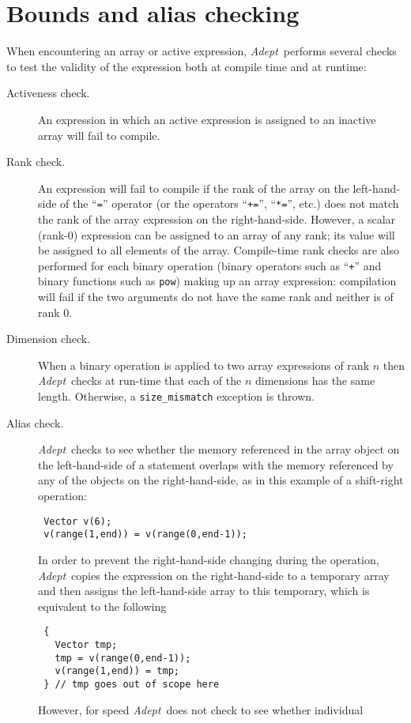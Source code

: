 \documentclass[a4,oneside]{book}
\def\codesize{\small}
\def\Adept{\emph{Adept}}
\def\code#1{{\codesize\texttt{#1}}}
\begin{document}
\section{Bounds and alias checking}
\label{sec:bounds}
When encountering an array or active expression, \Adept\ performs
several checks to test the validity of the expression both at compile
time and at runtime:
\begin{description}
\item[Activeness check.] An expression in which an active expression
  is assigned to an inactive array will fail to compile.
\item[Rank check.] An expression will fail to compile if the rank of
  the array on the left-hand-side of the ``\code{=}'' operator (or the
  operators ``\code{+=}'', ``\code{*=}'', etc.) does not match the
  rank of the array expression on the right-hand-side. However, a
  scalar (rank-0) expression can be assigned to an array of any rank;
  its value will be assigned to all elements of the
  array. Compile-time rank checks are also performed for each binary
  operation (binary operators such as ``\code{+}'' and binary
  functions such as \code{pow}) making up an array expression:
  compilation will fail if the two arguments do not have the same rank
  and neither is of rank 0.
\item[Dimension check.] When a binary operation is applied to two
  array expressions of rank $n$ then \Adept\ checks at run-time that
  each of the $n$ dimensions has the same length. Otherwise, a
  \code{size\_mismatch} exception is thrown.
\item[Alias check.] \Adept\ checks to see whether the memory
  referenced in the array object on the left-hand-side of a statement
  overlaps with the memory referenced by any of the objects on the
  right-hand-side, as in this example of a shift-right operation:
\begin{lstlisting}
 Vector v(6);
 v(range(1,end)) = v(range(0,end-1));
\end{lstlisting}
  In order to prevent the right-hand-side changing during the
  operation, \Adept\ copies the expression on the right-hand-side to a
  temporary array and then assigns the left-hand-side array to this
  temporary, which is equivalent to the following
\begin{lstlisting}
 {
   Vector tmp;
   tmp = v(range(0,end-1));
   v(range(1,end)) = tmp;
 } // tmp goes out of scope here
\end{lstlisting}
  However, for speed \Adept\ does not check to see whether individual

\end{description}
\end{document}
